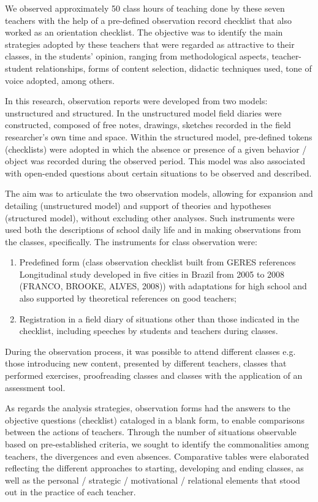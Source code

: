 \documentclass[11pt, a4paper]{article}
\begin{document}
We observed approximately 50 class hours of teaching done by these seven teachers with the help of a pre-defined
observation record checklist that also worked as an orientation checklist. The objective was to identify the main strategies
adopted by these teachers that were regarded as attractive to their classes, in the students' opinion, ranging from
methodological aspects, teacher-student relationships, forms of content selection, didactic techniques used, tone of voice
adopted, among others.

In this research, observation reports were developed from two models: unstructured and structured. In the unstructured
model field diaries were constructed, composed of free notes, drawings, sketches recorded in the field researcher's own
time and space. Within the structured model, pre-defined tokens (checklists) were adopted in which the absence or
presence of a given behavior / object was recorded during the observed period. This model was also associated with
open-ended questions about certain situations to be observed and described.

The aim was to articulate the two observation models, allowing for expansion and detailing (unstructured model) and
support of theories and hypotheses (structured model), without excluding other analyses. Such instruments were used
both the descriptions of school daily life and in making observations from the classes, specifically. The instruments for
class observation were:

\begin{enumerate}
    \item Predefined form (class observation checklist built from GERES references Longitudinal
    study developed in five cities in Brazil from 2005 to 2008 (FRANCO, BROOKE, ALVES, 2008)) with adaptations for
    high school and also supported by theoretical references on good teachers;

    \item Registration in a field diary of situations other than those indicated in the checklist, including speeches by students and teachers during classes.
\end{enumerate}

During the observation process, it was possible to attend different classes e.g. those introducing new content, presented by
different teachers, classes that performed exercises, proofreading classes and classes with the application of an assessment
tool.

As regards the analysis strategies, observation forms had the answers to the objective questions (checklist) cataloged in a
blank form, to enable comparisons between the actions of teachers. Through the number of situations observable based on
pre-established criteria, we sought to identify the commonalities among teachers, the divergences and even absences.
Comparative tables were elaborated reflecting the different approaches to starting, developing and ending classes, as well
as the personal / strategic / motivational / relational elements that stood out in the practice of each teacher.
\end{document}
